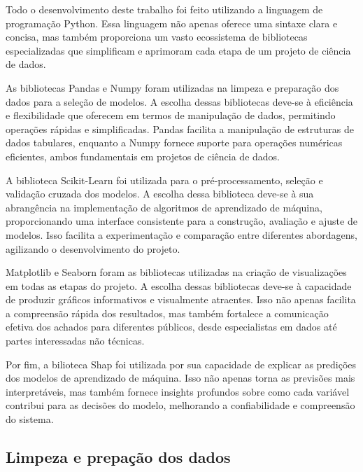 Todo o desenvolvimento deste trabalho foi feito utilizando a linguagem de programação Python. Essa linguagem não apenas oferece uma sintaxe clara e concisa, mas também proporciona um vasto ecossistema de bibliotecas especializadas que simplificam e aprimoram cada etapa de um projeto de ciência de dados.

As bibliotecas Pandas e Numpy foram utilizadas na limpeza e preparação dos dados para a seleção de modelos. A escolha dessas bibliotecas deve-se à eficiência e flexibilidade que oferecem em termos de manipulação de dados, permitindo operações rápidas e simplificadas. Pandas facilita a manipulação de estruturas de dados tabulares, enquanto a Numpy fornece suporte para operações numéricas eficientes, ambos fundamentais em projetos de ciência de dados.

A biblioteca Scikit-Learn \cite{Buitinck} foi utilizada para o pré-processamento, seleção e validação cruzada dos modelos. A escolha dessa biblioteca deve-se à sua abrangência na implementação de algoritmos de aprendizado de máquina, proporcionando uma interface consistente para a construção, avaliação e ajuste de modelos. Isso facilita a experimentação e comparação entre diferentes abordagens, agilizando o desenvolvimento do projeto.

Matplotlib e Seaborn foram as bibliotecas utilizadas na criação de visualizações em todas as etapas do projeto. A escolha dessas bibliotecas deve-se à capacidade de produzir gráficos informativos e visualmente atraentes. Isso não apenas facilita a compreensão rápida dos resultados, mas também fortalece a comunicação efetiva dos achados para diferentes públicos, desde especialistas em dados até partes interessadas não técnicas.

Por fim, a bilioteca Shap foi utilizada por sua capacidade de explicar as predições dos modelos de aprendizado de máquina. Isso não apenas torna as previsões mais interpretáveis, mas também fornece insights profundos sobre como cada variável contribui para as decisões do modelo, melhorando a confiabilidade e compreensão do sistema.

\subsection{Limpeza e prepação dos dados}\label{sec:limpeza}


